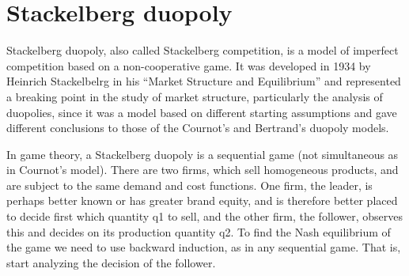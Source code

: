 \documentclass[]{report}
\begin{document}
\section{Stackelberg duopoly}
Stackelberg duopoly, also called Stackelberg competition, is a model of imperfect competition based on a non-cooperative game. It was developed in 1934 by Heinrich Stackelbelrg in his “Market Structure and Equilibrium” and represented a breaking point in the study of market structure, particularly the analysis of duopolies, since it was a model based on different starting assumptions and gave different conclusions to those of the Cournot’s and Bertrand’s duopoly models.

In game theory, a Stackelberg duopoly is a sequential game (not simultaneous as in Cournot’s model). There are two firms, which sell homogeneous products, and are subject to the same demand and cost functions. One firm, the leader, is perhaps better known or has greater brand equity, and is therefore better placed to decide first which quantity q1 to sell, and the other firm, the follower, observes this and decides on its production quantity q2. To find the Nash equilibrium of the game we need to use backward induction, as in any sequential game. That is, start analyzing the decision of the follower.
\end{document}
